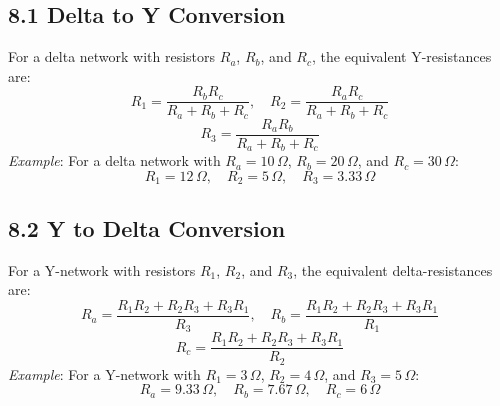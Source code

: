 \documentclass[10pt]{article}
\begin{document}
\begin{multicols}{2}
\subsection*{8.1 Delta to Y Conversion}
For a delta network with resistors \(R_a\), \(R_b\), and \(R_c\), the equivalent Y-resistances are:
\[
R_1 = \frac{R_b R_c}{R_a + R_b + R_c}, \quad 
R_2 = \frac{R_a R_c}{R_a + R_b + R_c}
\]
\[
R_3 = \frac{R_a R_b}{R_a + R_b + R_c}
\]
\textit{Example}: For a delta network with \(R_a = 10\,\Omega\), \(R_b = 20\,\Omega\), and \(R_c = 30\,\Omega\):
\[
R_1 = 12\,\Omega, \quad R_2 = 5\,\Omega, \quad R_3 = 3.33\,\Omega
\]

\subsection*{8.2 Y to Delta Conversion}
For a Y-network with resistors \(R_1\), \(R_2\), and \(R_3\), the equivalent delta-resistances are:
\[
R_a = \frac{R_1 R_2 + R_2 R_3 + R_3 R_1}{R_3}, \quad 
R_b = \frac{R_1 R_2 + R_2 R_3 + R_3 R_1}{R_1}
\]
\[
R_c = \frac{R_1 R_2 + R_2 R_3 + R_3 R_1}{R_2}
\]
\textit{Example}: For a Y-network with \(R_1 = 3\,\Omega\), \(R_2 = 4\,\Omega\), and \(R_3 = 5\,\Omega\):
\[
R_a = 9.33\,\Omega, \quad R_b = 7.67\,\Omega, \quad R_c = 6\,\Omega
\]

\end{multicols}
\end{document}
